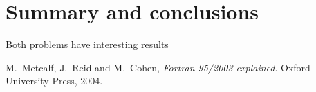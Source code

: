\documentclass[12pt]{article}
\begin{document}
\section{Summary and conclusions}

Both problems have interesting results

\begin{thebibliography}{}


 M.\ Metcalf, J.\ Reid and M.\ Cohen, {\it Fortran 95/2003 explained}. Oxford University Press, 2004.
 

\end{thebibliography}
\end{document}
